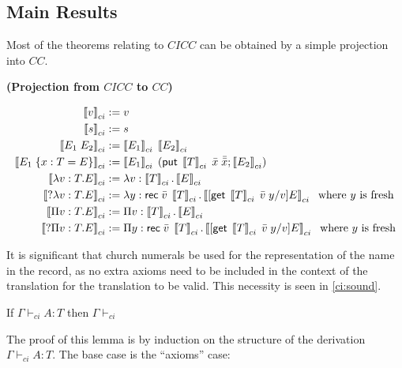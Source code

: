 \subsection{Main Results}

Most of the theorems relating to $CICC$ can be obtained by a simple projection into $CC$.

\newcommand{\CICCproj}[1]{ \left\llbracket #1 \right\rrbracket_{ci}}

\begin{definition}
\textbf{ (Projection from $CICC$ to $CC$) }

\begin{align}
\CICCproj{v} &:= v
\\
\CICCproj{s} &:= s
\\
\CICCproj{E_1 \; E_2} &:= \CICCproj{E_1} \; \CICCproj{E_2}
\\
\CICCproj{E_1 \; \{ x : T = E \}} &:= \CICCproj{E_1} \; (\m{put}\;\CICCproj{T}\;\bar{x}\; \bar{\bar{x}}; \CICCproj{E_2} )
\\
\CICCproj{\lambda v : T . E } &:= \lambda v : \CICCproj{T} . \CICCproj{E}
\\
\CICCproj{?\lambda v : T . E } &:= \lambda y : \m{rec}\;\bar{v}\; \CICCproj{T} . \CICCproj{ [ \m{get}\; \CICCproj{T}\; \bar{v}\; y  / v ] E}
\;\text{ where $y$ is fresh}
\\
\CICCproj{\Pi v : T . E } &:= \Pi v : \CICCproj{T} . \CICCproj{E}
\\
\CICCproj{?\Pi v : T . E } &:= \Pi y : \m{rec}\;\bar{v}\;\CICCproj{T} . \CICCproj{ [ \m{get}\;\CICCproj{T}\; \bar{v}\; y  / v ] E}
\;\text{ where $y$ is fresh}
\end{align}

\label{cicc:proj}
\end{definition}

It is significant that church numerals be used for the representation of the name in the record, 
as no extra axioms need to be included in the context of the translation for the translation to be valid.  
This necessity is seen in \ref{ci:sound}.

\begin{lemma}

If $\Gamma \vdash_{ci} A : T$ then $\Gamma \vdash_{ci}$

\label{ci:wfctxt}
\end{lemma}

The proof of this lemma is by induction on the structure of the derivation $\Gamma \vdash_{ci} A : T$.  The base case is the ``axioms'' case:


